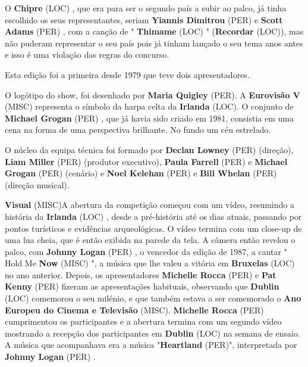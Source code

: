 \documentclass[12pt,a4paper]{article}
\begin{document}
O \textbf{Chipre} (LOC) , que era para ser o segundo país a subir ao palco, já tinha escolhido os seus representantes, seriam \textbf{Yiannis Dimitrou} (PER) e \textbf{Scott Adams} (PER) , com a canção de " \textbf{Thimame} (LOC) " (\textbf{Recordar} (LOC)), mas não puderam representar o seu país pois já tinham lançado o seu tema anos antes e isso é uma violação das regras do concurso.

Esta edição foi a primeira desde 1979 que teve dois apresentadores.

O logótipo do show, foi desenhado por \textbf{Maria Quigley} (PER). A \textbf{Eurovisão V} (MISC) representa o símbolo da harpa celta da \textbf{Irlanda} (LOC). O conjunto de \textbf{Michael Grogan} (PER) , que já havia sido criado em 1981, consistia em uma cena na forma de uma perspectiva brilhante. No fundo um céu estrelado.

O núcleo da equipa técnica foi formado por \textbf{Declan Lowney} (PER) (direção), \textbf{Liam Miller} (PER) (produtor executivo), \textbf{Paula Farrell} (PER) e \textbf{Michael Grogan} (PER) (cenário) e \textbf{Noel Kelehan} (PER) e \textbf{Bill Whelan} (PER) (direção musical).



\textbf{Visual} (MISC)A abertura da competição começou com um vídeo, resumindo a história da \textbf{Irlanda} (LOC) , desde a pré-história até os dias atuais, passando por pontos turísticos e evidências arqueológicas. O vídeo termina com um close-up de uma lua cheia, que é então exibida na parede da tela. A câmera então revelou o palco, com \textbf{Johnny Logan} (PER) , o vencedor da edição de 1987, a cantar " Hold Me \textbf{Now} (MISC) ", a música que lhe valeu a vitória em \textbf{Bruxelas} (LOC) no ano anterior. Depois, os apresentadores \textbf{Michelle Rocca} (PER) e \textbf{Pat Kenny} (PER) fizeram as apresentações habituais, observando que \textbf{Dublin} (LOC) comemorou o seu milénio, e que também estava a ser comemorado o \textbf{Ano Europeu do Cinema e Televisão} (MISC). \textbf{Michelle Rocca} (PER) cumprimentou os participantes e a abertura termina com um segundo vídeo mostrando a recepção dos participantes em \textbf{Dublin} (LOC) na semana de ensaio. A música que acompanhava era a música "\textbf{Heartland} (PER)", interpretada por \textbf{Johnny Logan} (PER) .
\end{document}
